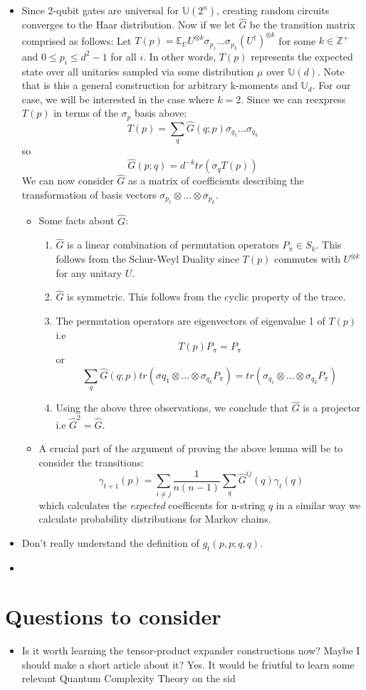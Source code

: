 \documentclass[a4paper]{article}
\begin{document}
\begin{itemize}
\item Since 2-qubit gates are universal for \(\mathbb{U}(2^n)\), creating random circuits converges to the Haar distribution. Now if we let \(\hat{G}\) be the transition matrix comprised as follows: Let \(T(p) = \mathbb{E}_U U^{\otimes k} \sigma_{p_1} \dots \sigma_{p_k} (U^\dagger)^{\otimes k}\) for some \(k \in \mathbb{Z}^+\) and \(0 \leq p_i \leq d^2-1\) for all \(i\). In other words, \(T(p)\) represents the expected state over all unitaries sampled via some distribution \(\mu\) over \(\mathbb{U}(d)\). Note that is this a general construction for arbitrary k-moments and \(\mathbb{U}_d\). For our case, we will be interested in the case where \(k=2\). Since we can reexpress \(T(p)\) in terms of the \(\sigma_p\) basis above:
$$ T(p) = \sum_{q} \hat{G}(q;p) \sigma_{q_1}\dots\sigma_{q_k} $$
so
$$ \hat{G}(p;q) = d^{-k} tr(\sigma_q T(p)) $$
We can now consider \(\hat{G}\) as a matrix of coefficients describing the transformation of basis vectors \(\sigma_{p_1}\otimes \dots \otimes \sigma_{p_k}\).

\begin{itemize}
\item Some facts about \(\hat{G}\):
\begin{enumerate}
\item \(\hat{G}\) is a linear combination of permutation operators \(P_{\pi} \in S_k\).
This follows from the Schur-Weyl Duality since \(T(p)\) commutes with \(U^{\otimes k}\) for any unitary \(U\).
\item \(\hat{G}\) is symmetric.
This follows from the cyclic property of the trace.
\item The permutation operators are eigenvectors of eigenvalue 1 of \(T(p)\) i.e
$$ T(p)P_{\pi} = P_{\pi} $$ or $$ \sum_{q} \hat{G}(q;p) tr(\sigma{q_1} \otimes \dots \otimes \sigma_{q_k} P_{\pi}) = tr(\sigma_{q_1} \otimes \dots \otimes \sigma_{q_k} P_{\pi}) $$

\item Using the above three observations, we conclude that \(\hat{G}\) is a projector i.e \(\hat{G}^2 = \hat{G}\).
\end{enumerate}
\item A crucial part of the argument of proving the above lemma will be to consider the transitions:
$$ \gamma_{t+1}(p) = \sum_{i\neq j} \frac{1}{n(n-1)}\sum_{q} \hat{G}^{ij}(q)\gamma_t(q) $$
which calculates the \emph{expected} coefficents for n-string \(q\) in a similar way we calculate probability distributions for Markov chains.
\end{itemize}

\item Don't really understand the definition of \(g_t(p,p;q,q)\).

\item 
\end{itemize}

\section{Questions to consider}
\label{sec:org6278c85}

\begin{itemize}
\item Is it worth learning the tensor-product expander constructions now? Maybe I should make a short article about it?
Yes. It would be friutful to learn some relevant Quantum Complexity Theory on the sid
\end{itemize}
\end{document}
